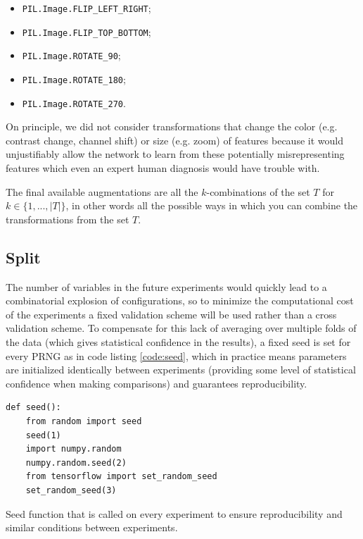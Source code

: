 \begin{itemize}
    \item \verb|PIL.Image.FLIP_LEFT_RIGHT|;
    \item \verb|PIL.Image.FLIP_TOP_BOTTOM|;
    \item \verb|PIL.Image.ROTATE_90|;
    \item \verb|PIL.Image.ROTATE_180|;
    \item \verb|PIL.Image.ROTATE_270|.
\end{itemize}

On principle, we did not consider transformations that change the color (e.g. contrast change, channel shift) or size (e.g. zoom) of features because it would unjustifiably allow the network to learn from these potentially misrepresenting features which even an expert human diagnosis would have trouble with.

The final available augmentations are all the $k$-combinations of the set $T$ for $k \in \{1, ..., |T|\}$, in other words all the possible ways in which you can combine the transformations from the set $T$.

\subsection{Split}

The number of variables in the future experiments would quickly lead to a combinatorial explosion of configurations, so to minimize the computational cost of the experiments a fixed validation scheme will be used rather than a cross validation scheme. To compensate for this lack of averaging over multiple folds of the data (which gives statistical confidence in the results), a fixed seed is set for every \ac{PRNG} as in code listing \ref{code:seed}, which in practice means parameters are initialized identically between experiments (providing some level of statistical confidence when making comparisons) and guarantees reproducibility.

\begin{listing}[ht]
\begin{verbatim}
def seed():
    from random import seed
    seed(1)
    import numpy.random
    numpy.random.seed(2)
    from tensorflow import set_random_seed
    set_random_seed(3)
\end{verbatim}
\caption{Seed function that is called on every experiment to ensure reproducibility and similar conditions between experiments.}
\label{code:seed}
\end{listing}

